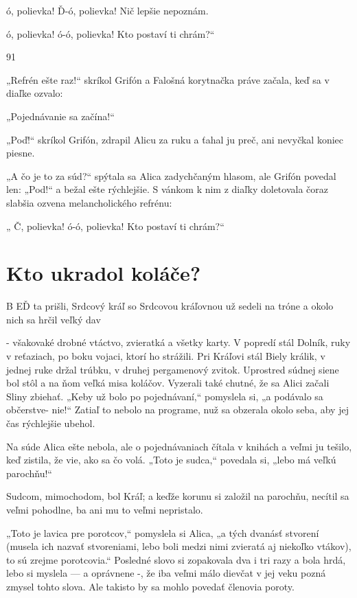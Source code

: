 \documentclass[12pt]{book}
\begin{document}
\begin{Parallel}[p]{}{}
{ó, polievka! Ď-ó, polievka!
Nič lepšie nepoznám.

ó, polievka! ó-ó, polievka!
Kto postaví ti chrám?“

91

„Refrén ešte raz!“ skríkol
Grifón a Falošná korytnačka práve
začala, keď sa v diaľke ozvalo:

„Pojednávanie sa začína!“

„Poď!“ skríkol Grifón, zdrapil
Alicu za ruku a ťahal ju preč, ani
nevyčkal koniec piesne.

„A čo je to za súd?“ spýtala sa
Alica zadychčaným hlasom, ale
Grifón povedal len: „Pod!“ a bežal
ešte rýchlejšie. S vánkom k nim
z diaľky doletovala čoraz slabšia
ozvena melancholického refrénu:

„ Č, polievka! ó-ó, polievka!
Kto postaví ti chrám?“

\section{Kto ukradol koláče?}

B EĎ ta prišli, Srdcový kráľ so Srdcovou kráľovnou
už sedeli na tróne a okolo nich sa hrčil veľký dav

- všakovaké drobné vtáctvo, zvieratká a všetky karty.
V popredí stál Dolník, ruky v reťaziach, po boku vojaci,
ktorí ho strážili. Pri Kráľovi stál Biely králik, v jednej ruke
držal trúbku, v druhej pergamenový zvitok. Uprostred
súdnej siene bol stôl a na ňom veľká misa koláčov. Vyzerali
také chutné, že sa Alici začali Sliny zbiehať. „Keby už bolo
po pojednávaní,“ pomyslela si, „a podávalo sa občerstve-
nie!“ Zatiaľ to nebolo na programe, nuž sa obzerala okolo
seba, aby jej čas rýchlejšie ubehol.

Na súde Alica ešte nebola, ale o pojednávaniach čítala
v knihách a veľmi ju tešilo, keď zistila, že vie, ako sa čo volá.
„Toto je sudca,“ povedala si, „lebo má veľkú parochňu!“

Sudcom, mimochodom, bol Kráľ; a keďže korunu si
založil na parochňu, necítil sa veľmi pohodlne, ba ani mu to
veľmi nepristalo.

„Toto je lavica pre porotcov,“ pomyslela si Alica, „a tých
dvanásť stvorení (musela ich nazvať stvoreniami, lebo boli
medzi nimi zvieratá aj niekoľko vtákov), to sú zrejme
porotcovia.“ Posledné slovo si zopakovala dva i tri razy
a bola hrdá, lebo si myslela — a oprávnene -, že iba veľmi
málo dievčat v jej veku pozná zmysel tohto slova. Ale takisto
by sa mohlo povedať členovia poroty.

}
\end{Parallel}
\end{document}
